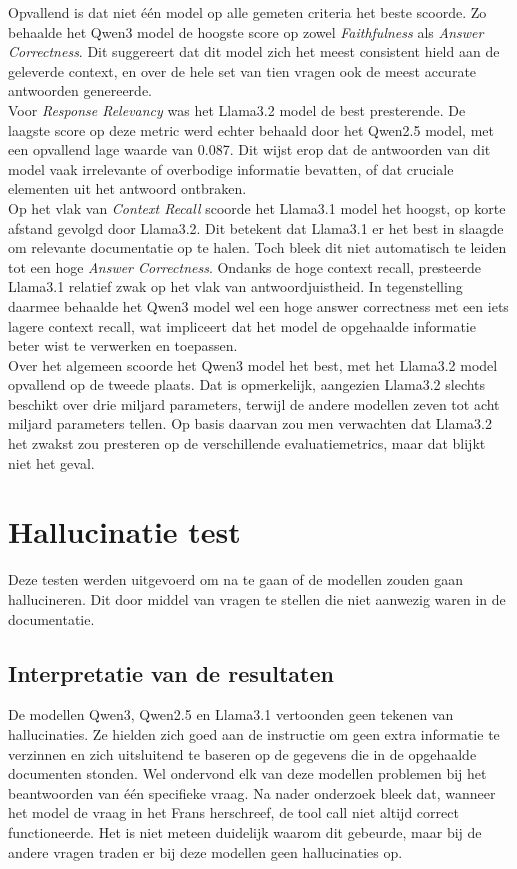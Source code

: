 Opvallend is dat niet één model op alle gemeten criteria het beste scoorde. Zo behaalde het Qwen3 model de hoogste score op zowel \textit{Faithfulness} als \textit{Answer Correctness}. Dit suggereert dat dit model zich het meest consistent hield aan de geleverde context, en over de hele set van tien vragen ook de meest accurate antwoorden genereerde.
\\[1em]
Voor \textit{Response Relevancy} was het Llama3.2 model de best presterende. De laagste score op deze metric werd echter behaald door het Qwen2.5 model, met een opvallend lage waarde van 0.087. Dit wijst erop dat de antwoorden van dit model vaak irrelevante of overbodige informatie bevatten, of dat cruciale elementen uit het antwoord ontbraken.
\\[1em]
Op het vlak van \textit{Context Recall} scoorde het Llama3.1 model het hoogst, op korte afstand gevolgd door Llama3.2. Dit betekent dat Llama3.1 er het best in slaagde om relevante documentatie op te halen. Toch bleek dit niet automatisch te leiden tot een hoge \textit{Answer Correctness}. Ondanks de hoge context recall, presteerde Llama3.1 relatief zwak op het vlak van antwoordjuistheid. In tegenstelling daarmee behaalde het Qwen3 model wel een hoge answer correctness met een iets lagere context recall, wat impliceert dat het model de opgehaalde informatie beter wist te verwerken en toepassen.
\\[1em]
Over het algemeen scoorde het Qwen3 model het best, met het Llama3.2 model opvallend op de tweede plaats. Dat is opmerkelijk, aangezien Llama3.2 slechts beschikt over drie miljard parameters, terwijl de andere modellen zeven tot acht miljard parameters tellen. Op basis daarvan zou men verwachten dat Llama3.2 het zwakst zou presteren op de verschillende evaluatiemetrics, maar dat blijkt niet het geval.

\section{Hallucinatie test}
Deze testen werden uitgevoerd om na te gaan of de modellen zouden gaan hallucineren. Dit door middel van vragen te stellen die niet aanwezig waren in de documentatie.

\subsection{Interpretatie van de resultaten}

De modellen Qwen3, Qwen2.5 en Llama3.1 vertoonden geen tekenen van hallucinaties. Ze hielden zich goed aan de instructie om geen extra informatie te verzinnen en zich uitsluitend te baseren op de gegevens die in de opgehaalde documenten stonden. Wel ondervond elk van deze modellen problemen bij het beantwoorden van één specifieke vraag. Na nader onderzoek bleek dat, wanneer het model de vraag in het Frans herschreef, de tool call niet altijd correct functioneerde. Het is niet meteen duidelijk waarom dit gebeurde, maar bij de andere vragen traden er bij deze modellen geen hallucinaties op.


